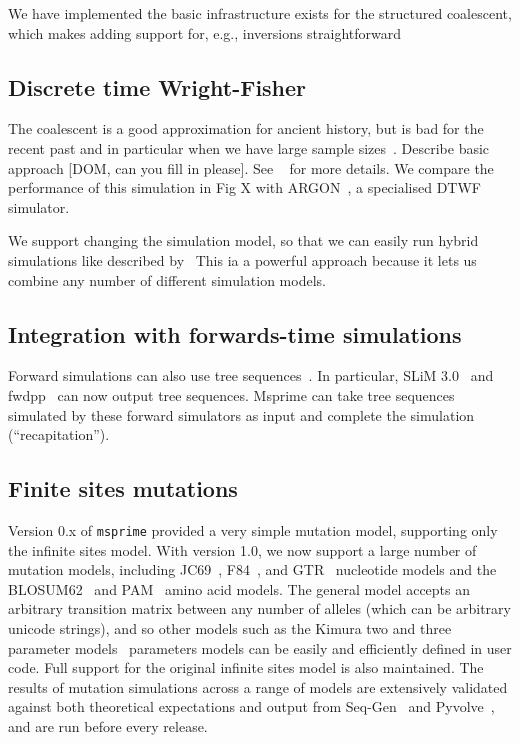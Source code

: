 \documentclass{article}
\begin{document}
We have implemented the basic infrastructure exists for the structured
coalescent, which makes adding support for, e.g.,
inversions straightforward~\citep{peischl2013sequential}


\subsection*{Discrete time Wright-Fisher}
The coalescent is a good approximation for ancient history, but
is bad for the recent past and in particular when we have large
sample
sizes~\citep{wakeley2012gene,bhaskar2014distortion,nelson2020accounting}.
Describe basic
approach [DOM, can you fill in please].
See ~\cite{nelson2020accounting} for more details.
We compare the performance of this simulation in Fig X
with ARGON~\citep{palamara2016argon}, a specialised DTWF simulator.

We support changing the simulation model, so that we can easily
run hybrid simulations like described by~\cite{bhaskar2014distortion}
This ia a powerful approach because it lets us combine any
number of different simulation models.

\subsection*{Integration with forwards-time simulations}
Forward simulations can also use tree
sequences~\citep{kelleher2018efficient,haller2018tree}. In particular,
SLiM 3.0~\citep{haller2019slim} and fwdpp~\citep{thornton2014cpp} can now output tree sequences.
Msprime can take tree sequences simulated by these forward simulators
as input and complete the simulation (``recapitation'').


\subsection*{Finite sites mutations}
Version 0.x of \texttt{msprime} provided a very simple mutation model,
supporting only the infinite sites model.
With version 1.0, we now support a large number of mutation models,
including
JC69~\citep{jukes1969evolution},
F84~\citep{felsenstein1996hidden},
and
GTR~\citep{tavare1986some} nucleotide models
and
the BLOSUM62~\citep{henikoff1992amino}
and PAM~\citep{dayhoff1978} amino acid models.
The general model accepts an arbitrary transition matrix between
any number of alleles (which can be arbitrary unicode strings),
and so other models such as the Kimura two and three
parameter models~\citep{kimura1980simple,kimura1981estimation}
parameters models can be easily
and efficiently defined in user code.
Full support for the original infinite sites model is also maintained.
The results of mutation simulations across a range of models are
extensively validated
against both theoretical expectations and output from
Seq-Gen~\citep{rambaut1997seq} and
Pyvolve~\citep{spielman2015pyvolve}, and are run before every
release.
\end{document}
